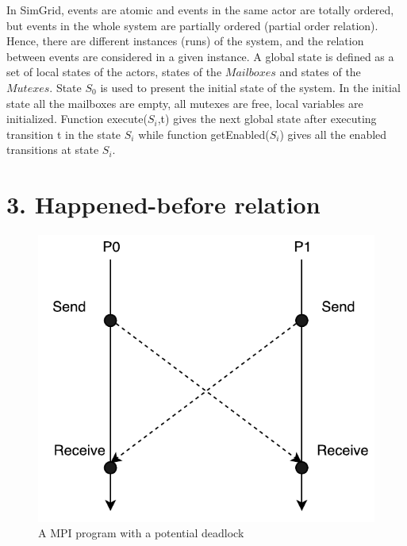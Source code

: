 \documentclass[a4paper,11pt]{article}
\begin{document}
In SimGrid, events are atomic and events in the same actor are totally ordered, but events in the whole system are partially ordered (partial order relation).  Hence, there are different instances (runs) of the system, and the relation between events are  considered in a given instance. A global state is defined as a set of local states of the actors, states of the $Mailboxes$ and states of the $Mutexes$. State $S_0$ is used to present the initial state of the system. In the initial state all the mailboxes are empty, all mutexes are free, local variables are initialized. Function execute($S_i$,t)  gives the next global state after executing transition t in the state $S_i$ while function getEnabled($S_i$) gives all the enabled transitions at state $S_i$.
\section*{3. Happened-before relation}
\begin{figure}[H]
	\label{fig:cycle_dependency}
	\begin{center}
		\centerline{\includegraphics[scale=.8]{example.pdf}}

	\end{center}
	\caption{A MPI program with a potential deadlock}
\end{figure}
\end{document}
